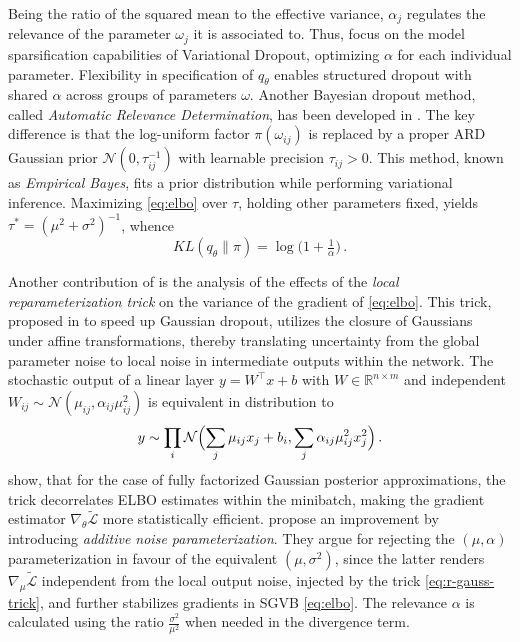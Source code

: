 \documentclass[a4paper,10pt]{article}
\begin{document}
Being the ratio of the squared mean to the effective variance, $\alpha_j$ regulates the
relevance of the parameter $\omega_j$ it is associated to. Thus, \citet{molchanov_variational_2017}
focus on the model sparsification capabilities of Variational Dropout, optimizing $\alpha$
for each individual parameter. Flexibility in specification of $q_\theta$ enables structured
dropout with shared $\alpha$ across groups of parameters $\omega$. Another Bayesian dropout
method, called \textit{Automatic Relevance Determination}, has been developed in \citep{kharitonov_variational_2018}.
The key difference is that the log-uniform factor $\pi(\omega_{ij})$ is replaced by a proper
ARD Gaussian prior $
  \mathcal{N}(0, \tau^{-1}_{ij})
$ with learnable precision $\tau_{ij} > 0$. This method, known as \textit{Empirical Bayes},
fits a prior distribution while performing variational inference. Maximizing \eqref{eq:elbo}
over $\tau$, holding other parameters fixed, yields $
  \tau^* = {(\mu^2 + \sigma^2)}^{-1}
$, whence
\begin{equation}  \label{eq:ard-kl-div-real}
  KL(q_\theta \| \pi)
    = \log{\bigl(1 + \tfrac1{\alpha} \bigr)}
    \,.
\end{equation}

Another contribution of \citep{kingma_variational_2015} is the analysis of the effects of the
\textit{local reparameterization trick} on the variance of the gradient of \eqref{eq:elbo}.
This trick, proposed in \citep{wang_fast_2013} to speed up Gaussian dropout, utilizes the
closure of Gaussians under affine transformations, thereby translating uncertainty from the
global parameter noise to local noise in intermediate outputs within the network.
%
The stochastic output of a linear layer $
  y = W^\top x + b
$ with $
  W \in \mathbb{R}^{n\times m}
$ and independent $
  W_{ij} \sim \mathcal{N}(\mu_{ij}, \alpha_{ij} \mu_{ij}^2)
$ is equivalent in distribution to
\begin{equation}  \label{eq:r-gauss-trick}
    y \sim \prod_i \mathcal{N}\Bigl(
          \sum_j \mu_{ij} x_j + b_i,
          \sum_j \alpha_{ij} \mu_{ij}^2 x_j^2
      \Bigr)
    \,.
\end{equation}
%
\citet{kingma_variational_2015} show, that for the case of fully factorized Gaussian
posterior approximations, the trick decorrelates ELBO estimates within the minibatch,
making the gradient estimator $\nabla_\theta \tilde{\mathcal{L}}$ more statistically
efficient. \citet{molchanov_variational_2017} propose an improvement by introducing
\textit{additive noise parameterization}. They argue for rejecting the $(\mu, \alpha)$
parameterization in favour of the equivalent $(\mu, \sigma^2)$, since the latter renders $
  \nabla_\mu \tilde{\mathcal{L}}
$ independent from the local output noise, injected by the trick \eqref{eq:r-gauss-trick},
and further stabilizes gradients in SGVB \eqref{eq:elbo}. The relevance $\alpha$ is
calculated using the ratio $
  \tfrac{\sigma^2}{\mu^2}
$ when needed in the divergence term.
\end{document}
